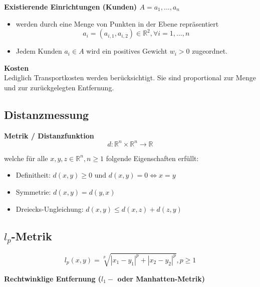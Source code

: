     \begin{defn}
      \textbf{Existierende Einrichtungen (Kunden) $A = {a_1, \dots, a_n}$}
      \begin{itemize}
        \item werden durch eine Menge von Punkten in der Ebene repräsentiert
        \[ a_i = (a_{i, 1}, a_{i, 2}) \in \mathbb{R}^2, \forall i = 1, \dots, n\] 
        \item Jedem Kunden $a_i \in A$ wird ein positives Gewicht $w_i > 0$ zugeordnet.
      \end{itemize}
    \end{defn}
    
    \begin{defn}
      \textbf{Kosten}\\
      Lediglich Transportkosten werden berücksichtigt. Sie sind proportional zur Menge und zur zurückgelegten Entfernung.
    \end{defn}
    

    \subsection{Distanzmessung} %
    \label{sub:distanzmessung}

      \begin{defn}
        \textbf{Metrik / Distanzfunktion}
        $$d: \mathbb{R}^n \times \mathbb{R}^n \rightarrow \mathbb{R}$$
      \end{defn}
      \par welche für alle $ x, y, z \in \mathbb{R}^n, n \geq 1$ folgende Eigenschaften erfüllt: 
      \begin{itemize}
            \item Definitheit: $d(x,y) \geq 0 \text{ und } d(x, y) = 0 \Leftrightarrow x = y$
            \item Symmetrie: $d(x,y) = d(y, x)$
            \item Dreiecks-Ungleichung: $d(x, y) \leq d(x, z) + d(z, y)$
          \end{itemize}
    

    \subsection{$l_p$-Metrik} %
    \label{sub:lp_metrik}

    \begin{equation}
      l_p(x, y) = \sqrt[p]{|x_1 - y_1| ^ p + |x_2 - y_2| ^ p}, p \geq 1
    \end{equation}
    \par \textbf{Rechtwinklige Entfernung ($l_1-$ oder Manhatten-Metrik)}

